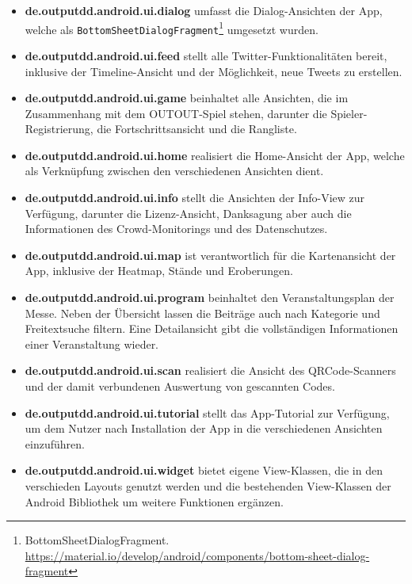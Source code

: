 \begin{itemize}
\begin{itemize}
            \item \textbf{de.outputdd.android.ui.dialog} umfasst die Dialog-Ansichten der App, welche als \texttt{BottomSheetDialogFragment}\footnote{BottomSheetDialogFragment. \newline \url{https://material.io/develop/android/components/bottom-sheet-dialog-fragment}} umgesetzt wurden.
            \item \textbf{de.outputdd.android.ui.feed} stellt alle Twitter-Funktionalitäten bereit, inklusive der Timeline-Ansicht und der Möglichkeit, neue Tweets zu erstellen.
            \item \textbf{de.outputdd.android.ui.game} beinhaltet alle Ansichten, die im Zusammenhang mit dem OUTOUT-Spiel stehen, darunter die Spieler-Registrierung, die Fortschrittsansicht und die Rangliste.
            \item \textbf{de.outputdd.android.ui.home} realisiert die Home-Ansicht der App, welche als Verknüpfung zwischen den verschiedenen Ansichten dient.
            \item \textbf{de.outputdd.android.ui.info} stellt die Ansichten der Info-View zur Verfügung, darunter die Lizenz-Ansicht, Danksagung aber auch die Informationen des Crowd-Monitorings und des Datenschutzes.
            \item \textbf{de.outputdd.android.ui.map} ist verantwortlich für die Kartenansicht der App, inklusive der Heatmap, Stände und Eroberungen.
            \item \textbf{de.outputdd.android.ui.program} beinhaltet den Veranstaltungsplan der Messe. Neben der Übersicht lassen die Beiträge auch nach Kategorie und Freitextsuche filtern. Eine Detailansicht gibt die vollständigen Informationen einer Veranstaltung wieder.
            \item \textbf{de.outputdd.android.ui.scan} realisiert die Ansicht des QRCode-Scanners und der damit verbundenen Auswertung von gescannten Codes.
            \item \textbf{de.outputdd.android.ui.tutorial} stellt das App-Tutorial zur Verfügung, um dem Nutzer nach Installation der App in die verschiedenen Ansichten einzuführen.
            \item \textbf{de.outputdd.android.ui.widget} bietet eigene View-Klassen, die in den verschieden Layouts genutzt werden und die bestehenden View-Klassen der Android Bibliothek um weitere Funktionen ergänzen.
        \end{itemize}
\end{itemize}


